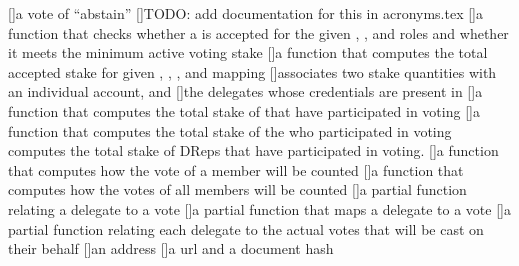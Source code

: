 [\protect{}]{a vote of ``abstain''}
[\protect{}]{TODO: add documentation for this in acronyms.tex}
[\protect{}]{a function that checks whether a \GovAction is accepted for the given \CC, \DRep, and \SPO roles and whether it meets the minimum active voting stake}
[\protect{}]{a function that computes the total accepted stake for given \GovRole, \CC, \stakeDistr, and \votes mapping}
[\protect{}]{associates two stake quantities with an individual account, \treasury and \reserves}
[\protect{}]{the delegates whose credentials are present in \DReps}
[\protect{}]{a function that computes the total stake of \DReps that have participated in voting}
[\protect{}]{a function that computes the total stake of the \DReps who participated in voting}
 computes the total stake of DReps that have participated in voting.
[\protect{}]{a function that computes how the vote of a \CC member will be counted}
[\protect{}]{a function that computes how the votes of all \CC members will be counted}
[\protect{}]{a partial function relating a delegate to a vote}
[\protect{}]{a partial function that maps a delegate to a vote}
[\protect{}]{a partial function relating each delegate to the actual votes
that will be cast on their behalf}
[\protect{}]{an address}
[\protect{}]{a url and a document hash}

